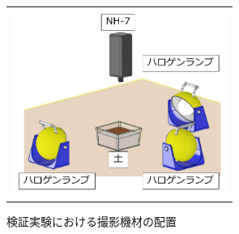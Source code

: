 \begin{figure}[p]
	\begin{center}
		\begin{tabular}{c}

			\begin{minipage}[t]{\linewidth}
			\hspace{3cm}\includegraphics[width=7cm]{./Ch3_SoilTypeDiscrimination/Fig/discrimination_experiment_setting_compressed.pdf}
			\caption{検証実験における撮影機材の配置}\label{fig:discrimination_experiment_setting}
			\vspace{2cm}
			\end{minipage}




			

		\end{tabular}
	\end{center}
\end{figure}


